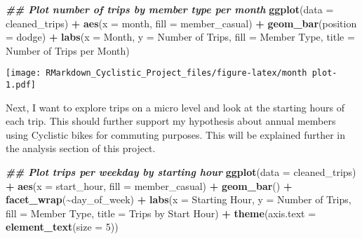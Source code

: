 \documentclass[
]{article}
\newenvironment{Shaded}{\begin{snugshade}}{\end{snugshade}}
\newcommand{\AttributeTok}[1]{\textcolor[rgb]{0.13,0.29,0.53}{#1}}
\newcommand{\DecValTok}[1]{\textcolor[rgb]{0.00,0.00,0.81}{#1}}
\newcommand{\DocumentationTok}[1]{\textcolor[rgb]{0.56,0.35,0.01}{\textbf{\textit{#1}}}}
\newcommand{\FunctionTok}[1]{\textcolor[rgb]{0.13,0.29,0.53}{\textbf{#1}}}
\newcommand{\NormalTok}[1]{#1}
\newcommand{\SpecialCharTok}[1]{\textcolor[rgb]{0.81,0.36,0.00}{\textbf{#1}}}
\newcommand{\StringTok}[1]{\textcolor[rgb]{0.31,0.60,0.02}{#1}}
\begin{document}
\begin{Shaded}
\begin{Highlighting}[]
\DocumentationTok{\#\# Plot number of trips by member type per month}
\FunctionTok{ggplot}\NormalTok{(}\AttributeTok{data =}\NormalTok{ cleaned\_trips) }\SpecialCharTok{+}
\FunctionTok{aes}\NormalTok{(}\AttributeTok{x =}\NormalTok{ month, }\AttributeTok{fill =}\NormalTok{ member\_casual) }\SpecialCharTok{+}
\FunctionTok{geom\_bar}\NormalTok{(}\AttributeTok{position =} \StringTok{\textquotesingle{}dodge\textquotesingle{}}\NormalTok{) }\SpecialCharTok{+}
\FunctionTok{labs}\NormalTok{(}\AttributeTok{x =} \StringTok{\textquotesingle{}Month\textquotesingle{}}\NormalTok{, }\AttributeTok{y =} \StringTok{\textquotesingle{}Number of Trips\textquotesingle{}}\NormalTok{, }\AttributeTok{fill =} \StringTok{\textquotesingle{}Member Type\textquotesingle{}}\NormalTok{, }\AttributeTok{title =} \StringTok{\textquotesingle{}Number of Trips per Month\textquotesingle{}}\NormalTok{)}
\end{Highlighting}
\end{Shaded}

\texttt{[image: RMarkdown\_Cyclistic\_Project\_files/figure-latex/month plot-1.pdf]}

Next, I want to explore trips on a micro level and look at the starting
hours of each trip. This should further support my hypothesis about
annual members using Cyclistic bikes for commuting purposes. This will
be explained further in the analysis section of this project.

\begin{Shaded}
\begin{Highlighting}[]
\DocumentationTok{\#\# Plot trips per weekday by starting hour}
\FunctionTok{ggplot}\NormalTok{(}\AttributeTok{data =}\NormalTok{ cleaned\_trips) }\SpecialCharTok{+}
\FunctionTok{aes}\NormalTok{(}\AttributeTok{x =}\NormalTok{ start\_hour, }\AttributeTok{fill =}\NormalTok{ member\_casual) }\SpecialCharTok{+}
\FunctionTok{geom\_bar}\NormalTok{() }\SpecialCharTok{+}
\FunctionTok{facet\_wrap}\NormalTok{(}\SpecialCharTok{\textasciitilde{}}\NormalTok{day\_of\_week) }\SpecialCharTok{+}
\FunctionTok{labs}\NormalTok{(}\AttributeTok{x =} \StringTok{\textquotesingle{}Starting Hour\textquotesingle{}}\NormalTok{, }\AttributeTok{y =} \StringTok{\textquotesingle{}Number of Trips\textquotesingle{}}\NormalTok{, }\AttributeTok{fill =} \StringTok{\textquotesingle{}Member Type\textquotesingle{}}\NormalTok{, }\AttributeTok{title =} \StringTok{\textquotesingle{}Trips by Start Hour\textquotesingle{}}\NormalTok{) }\SpecialCharTok{+}
\FunctionTok{theme}\NormalTok{(}\AttributeTok{axis.text =} \FunctionTok{element\_text}\NormalTok{(}\AttributeTok{size =} \DecValTok{5}\NormalTok{))}
\end{Highlighting}
\end{Shaded}
\end{document}

